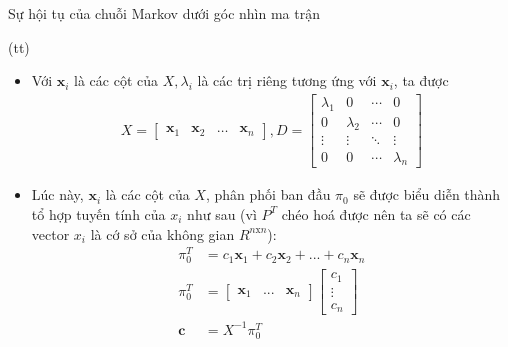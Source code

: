 \begin{frame}{Sự hội tụ của chuỗi Markov dưới góc nhìn ma trận}

\begin{myproof*}{(tt)}
    \begin{itemize}
         \item[\bullet] Với $\textbf{x}_i$ là các cột của $X, \lambda_i$ là các trị riêng tương ứng với $\textbf{x}_i$, ta được
            \begin{align}
                X = \begin{bmatrix}
                \textbf{x}_1& \textbf{x}_2 & \dots& \textbf{x}_n
                \end{bmatrix}, D = \begin{bmatrix}
                \lambda_1&0& \dotsb &0\\
                0&\lambda_2& \dotsb &0\\
                \vdots & \vdots & \ddots & \vdots\\
                0&0&\dotsb & \lambda_n
                \end{bmatrix}
            \end{align}
        \item[\bullet] Lúc này, $\textbf{x}_i$ là các cột của $X$, phân phối ban đầu $\pi_0$ sẽ được biểu diễn thành tổ hợp tuyến tính của $x_i$ như sau (vì $P^T$ chéo hoá được nên ta sẽ có các vector $x_i$ là cớ sở của không gian $R^{n\text{x}n}$):
        \begin{align}
            \pi_0^T &= c_1 \textbf{x}_1 + c_2 \textbf{x}_2 + ... + c_n \textbf{x}_n \\
            \pi_0^T &= 
            \begin{bmatrix}
                \textbf{x}_1 & ... & \textbf{x}_n 
            \end{bmatrix} 
            \begin{bmatrix}
                c_1 \\
                \vdots \\
                c_n
            \end{bmatrix}\\
            \textbf{c} &= X^{-1} \pi_0^T
        \end{align}
    \end{itemize}
\end{myproof*}
\end{frame}
